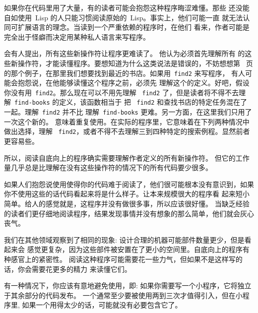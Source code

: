 如果你在代码里用了大量\utility{}，有的读者可能会抱怨这种程序晦涩难懂。那些
还没能自如使用~Lisp 的人只能习惯阅读原始的~Lisp。事实上，他们可能一直
就无法认同可扩展语言的理念。当读到一个严重依赖\utility{}的程序时，在他们
看来，作者可能是完全出于怪癖而决定用某种私人语言来写程序。

会有人提出，所有这些新操作符让程序更难读了。 他认为必须首先理解所有
的这些新操作符，才能读懂程序。要想知道为什么这类说法是错误的，不妨想想第~\pageref{page:bookshops} 
页的那个例子，在那里我们想要找到最近的书店。如果用~\texttt{find2} 来写程序，
有人可能会抱怨说，在他能够读懂这个程序之前，必须先
理解这个\utility{}的定义。好吧，假设你没有用~\texttt{find2}。那么现在可以不用先理解
~\texttt{find2} 了，但是读者将不得不去理解~\texttt{find-books} 的定义，该函数相当于
把 ~\texttt{find2} 和查找书店的特定任务混在了一起。理解~\texttt{find2} 并不比
理解~\texttt{find-books} 更难。另一方面，在这里我们只用了一次这个新的\utility{}。
\utility{}意味着重复使用。在实际的程序里，它意味着在下列两种情况中做出选择，理解
~\texttt{find2}，或者不得不去理解三到四种特定的搜索例程。显然前者更容易些。

所以，阅读自底向上的程序确实需要理解作者定义的所有新操作符。
但它的工作量几乎总是比理解在没有这些操作符的情况下的所有代码要少很多。

如果人们抱怨说使用\utility{}使得你的代码难于阅读了，他们很可能根本没有意识到，如果
你不使用这些\utility{}的话代码看起来将是什么样子。\bup{}让本来规模很大的程序看
起来短小简单。给人的感觉就是，这程序并没有做很多事，所以应该很好懂。
当缺乏经验的读者们更仔细地阅读程序，结果发现事情并没有想象的那么简单，他们就会灰心丧气。

我们在其他领域观察到了相同的现象: 设计合理的机器可能部件数量更少，但是看起来会
感觉更复杂，因为这些部件被安置在了更小的空间里。自底向上的程序有种感官上的紧密性。
阅读这种程序可能需要花一些力气，但如果不是这样写的话，你会需要花更多的精力
来读懂它们。

有一种情况下，你应该有意地避免使用\utility{}，即: 如果你需要写一个小程序，它将独立于其余部分的代码发布。
一个\utility{}通常至少要被使用两到三次才值得引入，但在小程序里,
如果一个\utility{}用得太少的话，可能就没有必要包含它了。

